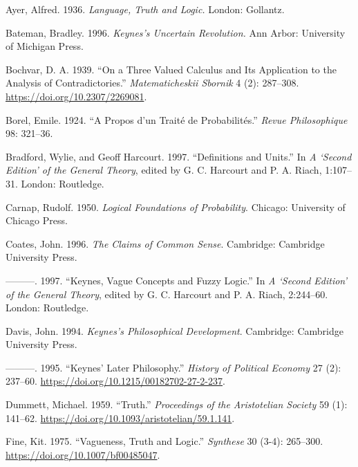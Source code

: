 \documentclass[noflushend]{philosophersimprint}
\begin{document}
\hypertarget{refs}{}
\begin{CSLReferences}{1}{0}
\leavevmode\hypertarget{ref-Ayer1936}{}%
Ayer, Alfred. 1936. \emph{Language, Truth and Logic.} London: Gollantz.

\leavevmode\hypertarget{ref-Bateman1996}{}%
Bateman, Bradley. 1996. \emph{Keynes's Uncertain Revolution.} Ann Arbor:
University of Michigan Press.

\leavevmode\hypertarget{ref-Bochvar1939}{}%
Bochvar, D. A. 1939. {``On a Three Valued Calculus and Its Application
to the Analysis of Contradictories.''} \emph{Matematicheskii Sbornik} 4
(2): 287--308. \url{https://doi.org/10.2307/2269081}.

\leavevmode\hypertarget{ref-Borel1924}{}%
Borel, Emile. 1924. {``A Propos d'un Trait{é} de Probabilit{é}s.''}
\emph{Revue Philosophique} 98: 321--36.

\leavevmode\hypertarget{ref-BradfordHarcourt1997}{}%
Bradford, Wylie, and Geoff Harcourt. 1997. {``Definitions and Units.''}
In \emph{A {`Second Edition'} of the General Theory}, edited by G. C.
Harcourt and P. A. Riach, 1:107--31. London: Routledge.

\leavevmode\hypertarget{ref-Carnap1950}{}%
Carnap, Rudolf. 1950. \emph{Logical Foundations of Probability}.
Chicago: University of Chicago Press.

\leavevmode\hypertarget{ref-Coates1996}{}%
Coates, John. 1996. \emph{The Claims of Common Sense}. Cambridge:
Cambridge University Press.

\leavevmode\hypertarget{ref-Coates1997}{}%
---------. 1997. {``Keynes, Vague Concepts and Fuzzy Logic.''} In
\emph{A {`Second Edition'} of the General Theory}, edited by G. C.
Harcourt and P. A. Riach, 2:244--60. London: Routledge.

\leavevmode\hypertarget{ref-Davis1994}{}%
Davis, John. 1994. \emph{Keynes's Philosophical Development}. Cambridge:
Cambridge University Press.

\leavevmode\hypertarget{ref-Davis1995}{}%
---------. 1995. {``Keynes' Later Philosophy.''} \emph{History of
Political Economy} 27 (2): 237--60.
\url{https://doi.org/10.1215/00182702-27-2-237}.

\leavevmode\hypertarget{ref-Dummett1959}{}%
Dummett, Michael. 1959. {``Truth.''} \emph{Proceedings of the
Aristotelian Society} 59 (1): 141--62.
\url{https://doi.org/10.1093/aristotelian/59.1.141}.

\leavevmode\hypertarget{ref-Fine1975a}{}%
Fine, Kit. 1975. {``Vagueness, Truth and Logic.''} \emph{Synthese} 30
(3-4): 265--300. \url{https://doi.org/10.1007/bf00485047}.


\end{CSLReferences}
\end{document}
